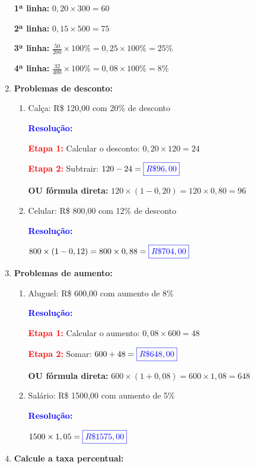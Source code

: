 \documentclass[11pt]{article}
\newcommand{\respostaNum}[1]{\textcolor{blue}{\boxed{#1}}}
\newcommand{\resolucao}{\textbf{\textcolor{blue}{Resolução:}}}
\begin{document}
\begin{multicols}{2}
\begin{enumerate}[leftmargin=*]
\textbf{1ª linha:} $0,20 \times 300 = 60$

\textbf{2ª linha:} $0,15 \times 500 = 75$

\textbf{3ª linha:} $\frac{50}{200} \times 100\% = 0,25 \times 100\% = 25\%$

\textbf{4ª linha:} $\frac{32}{400} \times 100\% = 0,08 \times 100\% = 8\%$

\item \textbf{Problemas de desconto:}

\begin{enumerate}[label=\alph*)]
\item Calça: R\$ 120,00 com 20\% de desconto

\resolucao

\textbf{\textcolor{red}{Etapa 1:}} Calcular o desconto: $0,20 \times 120 = 24$

\textbf{\textcolor{red}{Etapa 2:}} Subtrair: $120 - 24 = \respostaNum{R\$ 96,00}$

\textbf{OU fórmula direta:} $120 \times (1 - 0,20) = 120 \times 0,80 = 96$

\item Celular: R\$ 800,00 com 12\% de desconto

\resolucao

$800 \times (1 - 0,12) = 800 \times 0,88 = \respostaNum{R\$ 704,00}$
\end{enumerate}

\item \textbf{Problemas de aumento:}

\begin{enumerate}[label=\alph*)]
\item Aluguel: R\$ 600,00 com aumento de 8\%

\resolucao

\textbf{\textcolor{red}{Etapa 1:}} Calcular o aumento: $0,08 \times 600 = 48$

\textbf{\textcolor{red}{Etapa 2:}} Somar: $600 + 48 = \respostaNum{R\$ 648,00}$

\textbf{OU fórmula direta:} $600 \times (1 + 0,08) = 600 \times 1,08 = 648$

\item Salário: R\$ 1500,00 com aumento de 5\%

\resolucao

$1500 \times 1,05 = \respostaNum{R\$ 1575,00}$
\end{enumerate}

\item \textbf{Calcule a taxa percentual:}


\end{enumerate}
\end{multicols}
\end{document}

